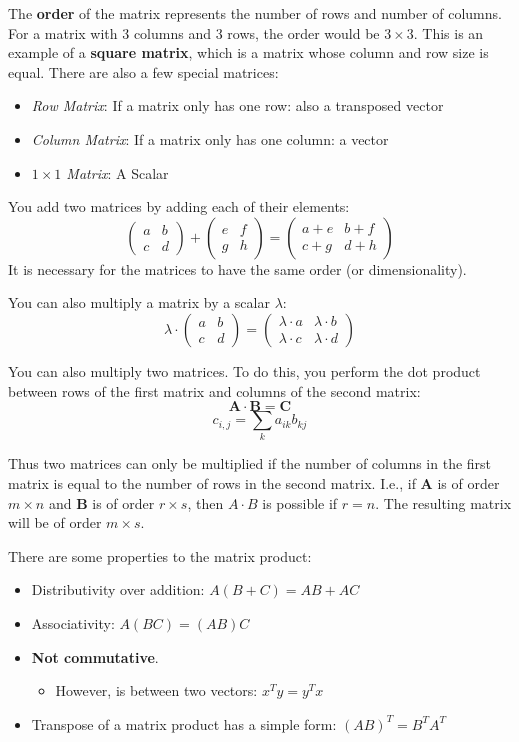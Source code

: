 The \textbf{order} of the matrix represents the number of rows and number of columns. For a matrix with 3 columns and 3 rows, the order would be $3 \times 3$. This is an example of a \textbf{square matrix}, which is a matrix whose column and row size is equal. There are also a few special matrices:
\begin{itemize}
	\item \textit{Row Matrix}: If a matrix only has one row: also a transposed vector
	\item \textit{Column Matrix}: If a matrix only has one column: a vector
	\item \textit{$1 \times 1$ Matrix}: A Scalar
\end{itemize}

You add two matrices by adding each of their elements:
\[
	\begin{pmatrix} a & b \\ c & d \end{pmatrix}
	+ \begin{pmatrix} e & f \\ g & h \end{pmatrix}
	= \begin{pmatrix} a + e & b + f \\ c + g & d + h \end{pmatrix}
\]
It is necessary for the matrices to have the same order (or dimensionality).

You can also multiply a matrix by a scalar \(\lambda\):
\[
	\lambda \cdot \begin{pmatrix} a & b \\ c & d \end{pmatrix}
	= \begin{pmatrix} \lambda \cdot a & \lambda \cdot b \\ \lambda \cdot c & \lambda \cdot d \end{pmatrix}
\]

You can also multiply two matrices. To do this, you perform the dot product between rows of the first matrix and columns of the second matrix:
\[
	\mathbf{A \cdot B = C}
\]
\[
	c_{i,j} = \sum_k a_{ik}b_{kj}
\]

Thus two matrices can only be multiplied if the number of columns in the first matrix is equal to the number of rows in the second matrix. I.e., if \textbf{A} is of order $m \times n$ and \textbf{B} is of order $r \times s$, then $A \cdot B$ is possible if $r = n$. The resulting matrix will be of order $m \times s$.

There are some properties to the matrix product:
\begin{itemize}
	\item Distributivity over addition: \(A(B+C) = AB+AC\)
	\item Associativity: \(A(BC) = (AB)C\)
	\item \textbf{Not commutative}.
	      \begin{itemize}
		      \item However, is between two vectors: $x^{T}y = y^{T}x$
	      \end{itemize}
	\item Transpose of a matrix product has a simple form: $(AB)^{T} = B^{T}A^{T}$
\end{itemize}

